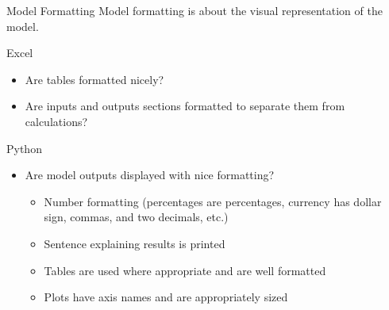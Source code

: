 \documentclass[]{article}
\begin{document}
\begin{section}{Model Formatting}
Model formatting is about the visual representation of the model.
\begin{subsection}{Excel}
\begin{itemize}
\item Are tables formatted nicely?
\item Are inputs and outputs sections formatted to separate them from calculations?
\end{itemize}
\end{subsection}
\begin{subsection}{Python}
\begin{itemize}
\item Are model outputs displayed with nice formatting?
\begin{itemize}
\item Number formatting (percentages are percentages, currency has dollar sign, commas, and two decimals, etc.)
\item Sentence explaining results is printed
\item Tables are used where appropriate and are well formatted
\item Plots have axis names and are appropriately sized
\end{itemize}
\end{itemize}
\end{subsection}
\end{section}
\end{document}

